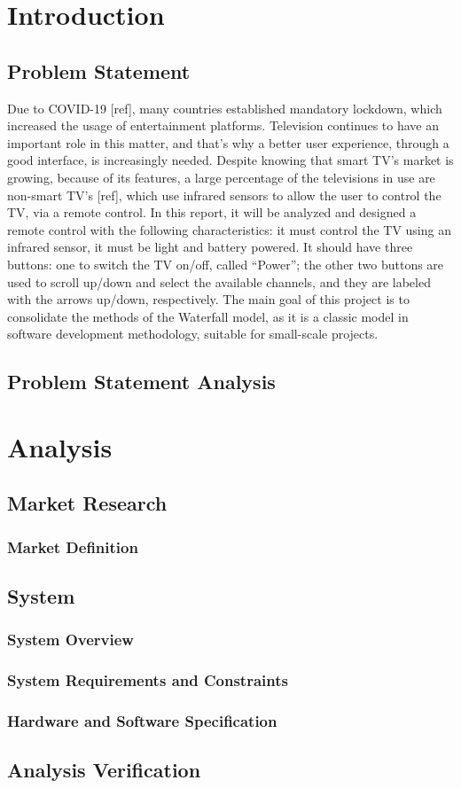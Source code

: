 \documentclass[12pt, letterpaper]{report}
\begin{document}
\chapter{Introduction}
\section{Problem Statement}
Due to COVID-19 [ref], many countries established mandatory lockdown, which increased the usage of entertainment platforms. Television continues to have an important role in this matter, and that’s why a better user experience, through a good interface, is increasingly needed.
Despite knowing that smart TV’s market is growing, because of its features, a large percentage of the televisions in use are non-smart TV’s [ref], which use infrared sensors to allow the user to control the TV, via a remote control. In this report, it will be analyzed and designed a remote control with the following characteristics: it must control the TV using an infrared sensor, it must be light and battery powered. It should have three buttons: one to switch the TV on/off, called “Power”; the other two buttons are used to scroll up/down and select the available channels, and they are labeled with the arrows up/down, respectively. The main goal of this project is to consolidate the methods of the Waterfall model, as it is a classic model in software development methodology, suitable for small-scale projects.

\section{Problem Statement Analysis}

\chapter{Analysis}
\section{Market Research}
\subsection{Market Definition}


\section{System}
\subsection{System Overview}
\subsection{System Requirements and Constraints}
\subsection{Hardware and Software Specification}

\section{Analysis Verification}
\end{document}
